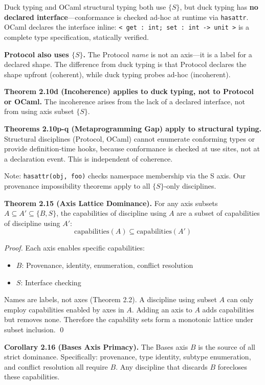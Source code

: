 Duck typing and OCaml structural typing both use \(\{S\}\), but duck
typing has \textbf{no declared interface}---conformance is checked
ad-hoc at runtime via \texttt{hasattr}. OCaml declares the interface
inline:
\texttt{\textless{}\ get\ :\ int;\ set\ :\ int\ -\textgreater{}\ unit\ \textgreater{}}
is a complete type specification, statically verified.

\textbf{Protocol also uses \(\{S\}\).} The Protocol \emph{name} is not an axis---it is a label for a declared shape. The difference from duck typing is that Protocol declares the shape upfront (coherent), while duck typing probes ad-hoc (incoherent).

\textbf{Theorem 2.10d (Incoherence) applies to duck typing, not to
Protocol or OCaml.} The incoherence arises from the lack of a declared interface,
not from using axis subset \(\{S\}\).

\textbf{Theorems 2.10p-q (Metaprogramming Gap) apply to structural typing.}
Structural disciplines (Protocol, OCaml) cannot enumerate conforming types
or provide definition-time hooks, because conformance is checked at use sites, not at a declaration event. This is independent of coherence.

Note: \texttt{hasattr(obj,\ \textquotesingle{}foo\textquotesingle{})}
checks namespace membership via the S axis.
Our provenance impossibility theorems apply to all \(\{S\}\)-only disciplines.

\textbf{Theorem 2.15 (Axis Lattice Dominance).} For any axis subsets
\(A \subseteq A' \subseteq \{B, S\}\), the capabilities of discipline
using \(A\) are a subset of capabilities of discipline using \(A'\):
\[\text{capabilities}(A) \subseteq \text{capabilities}(A')\]

\emph{Proof.} Each axis enables specific capabilities:
\begin{itemize}
\tightlist
\item \(B\): Provenance, identity, enumeration, conflict resolution
\item \(S\): Interface checking
\end{itemize}
Names are labels, not axes (Theorem 2.2). A discipline using subset \(A\) can only employ capabilities enabled by
axes in \(A\). Adding an axis to \(A\) adds capabilities but removes
none. Therefore the capability sets form a monotonic lattice under
subset inclusion. \qed

\textbf{Corollary 2.16 (Bases Axis Primacy).} The Bases axis \(B\) is
the source of all strict dominance. Specifically: provenance, type
identity, subtype enumeration, and conflict resolution all require
\(B\). Any discipline that discards \(B\) forecloses these capabilities.

